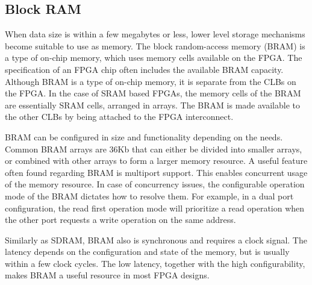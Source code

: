 \documentclass[12pt]{report}
\begin{document}


\subsection{Block RAM}
When data size is within a few megabytes or less, lower level storage mechanisms become suitable to use as memory. The block random-access memory (BRAM) is a type of on-chip memory, which uses memory cells available on the FPGA. The specification of an FPGA chip often includes the available BRAM capacity. Although BRAM is a type of on-chip memory, it is separate from the CLBs on the FPGA. In the case of SRAM based FPGAs, the memory cells of the BRAM are essentially SRAM cells, arranged in arrays. The BRAM is made available to the other CLBs by being attached to the FPGA interconnect.
\par
BRAM can be configured in size and functionality depending on the needs. Common BRAM arrays are 36Kb that can either be divided into smaller arrays, or combined with other arrays to form a larger memory resource. A useful feature often found regarding BRAM is multiport support. This enables concurrent usage of the memory resource. In case of concurrency issues, the configurable operation mode of the BRAM dictates how to resolve them. For example, in a dual port configuration, the read first operation mode will prioritize a read operation when the other port requests a write operation on the same address. \citep{XilMemMan}
\par
\par
Similarly as SDRAM, BRAM also is synchronous and requires a clock signal. The latency depends on the configuration and state of the memory, but is usually within a few clock cycles. The low latency, together with the high configurability, makes BRAM a useful resource in most FPGA designs. \citep{XilMemMan}
\end{document}

